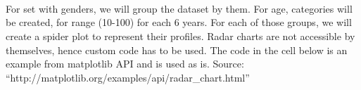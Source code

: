 \documentclass[11pt]{article}
\begin{document}
    
    \begin{center}
    \end{center}
    { \hspace*{\fill} \\}
    
    \begin{center}
    \end{center}
    { \hspace*{\fill} \\}
    
    \begin{center}
    \end{center}
    { \hspace*{\fill} \\}
    
    For set with genders, we will group the dataset by them. For age,
categories will be created, for range (10-100) for each 6 years. For
each of those groups, we will create a spider plot to represent their
profiles. Radar charts are not accessible by themselves, hence custom
code has to be used. The code in the cell below is an example from
matplotlib API and is used as is. Source:
``http://matplotlib.org/examples/api/radar\_chart.html''
\end{document}
